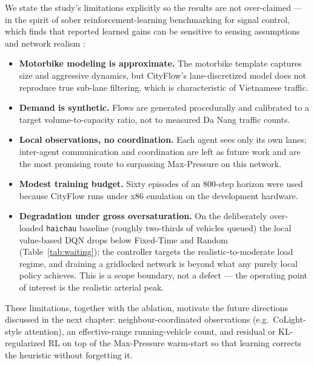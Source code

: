 We state the study's limitations explicitly so the results are not over-claimed --- in the
spirit of sober reinforcement-learning benchmarking for signal control, which finds that
reported learned gains can be sensitive to sensing assumptions and network realism
\cite{RESCO_2021}:
\begin{itemize}
  \item \textbf{Motorbike modeling is approximate.} The motorbike template captures size
        and aggressive dynamics, but CityFlow's lane-discretized model does not reproduce
        true sub-lane filtering, which is characteristic of Vietnamese traffic.
  \item \textbf{Demand is synthetic.} Flows are generated procedurally and calibrated to a
        target volume-to-capacity ratio, not to measured Da Nang traffic counts.
  \item \textbf{Local observations, no coordination.} Each agent sees only its own lanes;
        inter-agent communication and coordination are left as future work and are the
        most promising route to surpassing Max-Pressure on this network.
  \item \textbf{Modest training budget.} Sixty episodes of an $800$-step horizon were used
        because CityFlow runs under x86 emulation on the development hardware.
  \item \textbf{Degradation under gross oversaturation.} On the deliberately over-loaded
        \texttt{haichau} baseline (roughly two-thirds of vehicles queued) the local
        value-based DQN drops below Fixed-Time and Random (Table~\ref{tab:waiting}); the
        controller targets the realistic-to-moderate load regime, and draining a gridlocked
        network is beyond what any purely local policy achieves. This is a scope boundary, not
        a defect --- the operating point of interest is the realistic arterial peak.
\end{itemize}

These limitations, together with the ablation, motivate the future directions discussed in
the next chapter: neighbour-coordinated observations (e.g.\ CoLight-style attention),
an effective-range running-vehicle count, and residual or KL-regularized RL on top of the
Max-Pressure warm-start so that learning corrects the heuristic without forgetting it.
